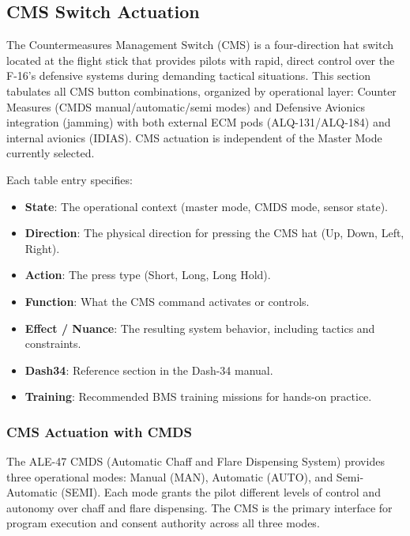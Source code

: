 \documentclass[11pt,a4paper]{article}
\begin{document}
\subsection{CMS Switch Actuation}\label{sec:C5-S2}

The Countermeasures Management Switch (CMS) is a four-direction hat switch located at the flight stick that provides pilots with rapid, direct control over the F-16's defensive systems during demanding tactical situations. This section tabulates all CMS button combinations, organized by operational layer: Counter Measures (CMDS manual/automatic/semi modes) and Defensive Avionics integration (jamming) with both external ECM pods (ALQ-131/ALQ-184) and internal avionics (IDIAS). CMS actuation is independent of the Master Mode currently selected.

Each table entry specifies:

\begin{itemize}
  \item \textbf{State}: The operational context (master mode, CMDS mode, sensor state).
  \item \textbf{Direction}: The physical direction for pressing the CMS hat (Up, Down, Left, Right).
  \item \textbf{Action}: The press type (Short, Long, Long Hold).
  \item \textbf{Function}: What the CMS command activates or controls.
  \item \textbf{Effect / Nuance}: The resulting system behavior, including tactics and constraints.
  \item \textbf{Dash34}: Reference section in the Dash-34 manual.
  \item \textbf{Training}: Recommended BMS training missions for hands-on practice.
\end{itemize}

\subsubsection{CMS Actuation with CMDS}\label{sec:C5-S2-S1}


The ALE-47 CMDS (Automatic Chaff and Flare Dispensing System) provides three operational modes: Manual (MAN), Automatic (AUTO), and Semi-Automatic (SEMI). Each mode grants the pilot different levels of control and autonomy over chaff and flare dispensing. The CMS is the primary interface for program execution and consent authority across all three modes.
\end{document}
